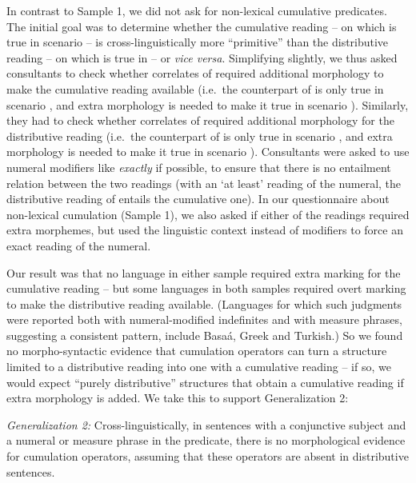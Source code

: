 \documentclass[output=paper]{langscibook}
\begin{document}
In contrast to Sample 1, we did not ask for non-lexical cumulative predicates. The initial goal was to determine whether the cumulative reading -- on which  is true in scenario  -- is cross-linguistically more ``primitive'' than the distributive reading -- on which  is true in  -- or \textit{vice versa}. Simplifying slightly, we thus asked consultants to check whether correlates of  required additional morphology to make the cumulative reading available (i.e.~the counterpart of  is only true in scenario  , and extra morphology is needed to make it true in scenario  ). Similarly, they had to check whether correlates of  required additional morphology for the distributive reading (i.e.~the counterpart of  is only true in scenario , and extra morphology is needed to make it true in scenario ). Consultants were asked to use numeral modifiers like \textit{exactly} if possible, to ensure that there is no entailment relation between the two readings (with an `at least' reading of the numeral, the distributive reading of  entails the cumulative one). In our questionnaire about non-lexical cumulation (Sample 1), we also asked if either of the readings required extra morphemes, but used the linguistic context instead of modifiers to force an exact reading of the numeral.

Our result was that no language in either sample required extra marking for the cumulative reading -- but some languages in both samples required overt marking to make the distributive reading available. (Languages for which such judgments were reported both with numeral-modified indefinites and with measure phrases, suggesting a consistent pattern, include Basaá, Greek and Turkish.) So we found no morpho-syntactic evidence that cumulation operators can turn a structure limited to a distributive reading into one with a cumulative reading -- if so, we would expect ``purely distributive'' structures that obtain a cumulative reading if extra morphology is added. We take this to support Generalization 2:

\ea \textit{Generalization 2:} Cross-linguistically, in sentences with a conjunctive subject and a numeral or measure phrase
 in the predicate, there is no morphological evidence for cumulation operators, assuming that these operators are absent in distributive sentences. \z
\end{document}
